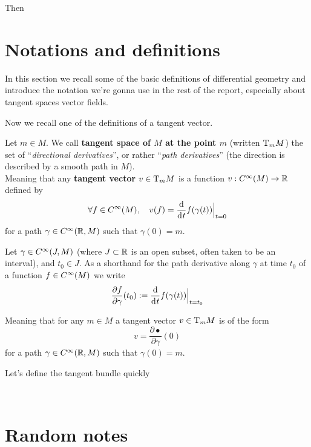 		Then

\newpage

\section{Notations and definitions}

	In this section we recall some of the basic definitions of differential geometry and introduce the notation we're gonna use in the rest of the report, especially about tangent spaces vector fields.


	Now we recall one of the definitions of a tangent vector.

	\begin{definition}
		Let $m \in M$.
		We call \textbf{tangent space of $M$ at the point $m$} (written $\mathrm{T}_m{M}$) the set of ``\emph{directional derivatives}'', or rather ``\emph{path derivatives}'' (the direction is described by a smooth path in $M$). \\
		Meaning that any \textbf{tangent vector} $v \in \mathrm{T}_m{M}$ is a function $v: C^\infty(M) \to \mathbb{R}$ defined by
		$$
			\forall f \in \Cinf(M), \quad v(f) = \frac{\d}{\di{t}} f(\gamma(t)) \Big|_{t=0}
		$$
		for a path $\gamma \in C^\infty(\mathbb{R}, M)$ such that $\gamma(0) = m$.
	\end{definition}

	\begin{notation}
		Let $\gamma \in C^\infty(J, M)$ (where $J \subset \mathbb{R}$ is an open subset, often taken to be an interval), and $t_0 \in J$.
		As a shorthand for the path derivative along $\gamma$ at time $t_0$ of a function $f \in C^\infty(M)$ we write 
		$$
			\frac{\partial f}{\partial \gamma}(t_0) := \frac{\d}{\di{t}} f(\gamma(t)) \Big|_{t=t_0}
		$$

		Meaning that for any $m \in M$ a tangent vector $v \in \mathrm{T}_m{M}$ is of the form
		$$
			v = \frac{\partial \bullet}{\partial \gamma}(0)
		$$
		for a path $\gamma \in C^\infty(\mathbb{R}, M)$ such that $\gamma(0) = m$.
	\end{notation}


	Let's define the tangent bundle quickly


\newpage
~
\newpage

\section{Random notes}

